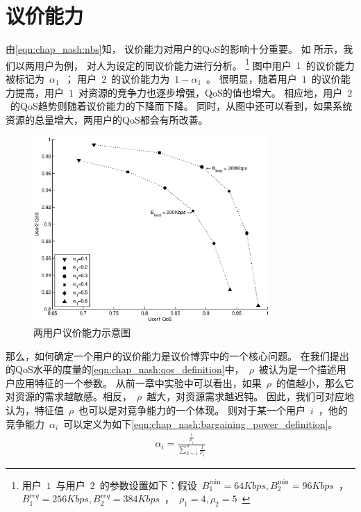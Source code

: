 \section{议价能力}
由\eqref{eqn:chap_nash:nbs}知，
议价能力对用户的QoS的影响十分重要。
如 所示，我们以两用户为例，
对人为设定的同议价能力进行分析。
\footnote{用户~$1$~与用户~$2$~的参数设置如下：假设~$B_1^{\min}=64Kbps, B_2^{\min}=96Kbps$~，~$B_1^{req}=256Kbps, B_2^{req}=384Kbps$~，~$\rho_1=4, \rho_2=5$~}
图中用户~$1$~的议价能力被标记为~$\alpha_1$~；
用户~$2$~的议价能力为~$1-\alpha_1$~。
很明显，随着用户~$1$~的议价能力提高，用户~$1$~对资源的竞争力也逐步增强，QoS的值也增大。
相应地，用户~$2$~的QoS趋势则随着议价能力的下降而下降。
同时，从图中还可以看到，如果系统资源的总量增大，两用户的QoS都会有所改善。
\begin{figure}[!tb] 
    \centering 
    \includegraphics[width = 9cm]{chap_nash_two_users_nbs_qos.eps} 
    \caption{两用户议价能力示意图}
    \label{fig:chap_nash:two_users_nbs_qos} 
\end{figure}
那么，如何确定一个用户的议价能力是议价博弈中的一个核心问题。
在我们提出的QoS水平的度量的\eqref{eqn:chap_nash:qos_definition}中，~$\rho$~被认为是一个描述用户应用特征的一个参数。
从前一章中实验中可以看出，如果~$\rho$~的值越小，那么它对资源的需求越敏感。相反，~$\rho$~越大，对资源需求越迟钝。
因此，我们可对应地认为，特征值~$\rho$~也可以是对竞争能力的一个体现。
则对于某一个用户~$i$~，他的竞争能力~$\alpha_i$~可以定义为如下\eqref{eqn:chap_nash:bargaining_power_definition}。
\begin{align}
    \alpha_i = \frac{\frac{1}{\rho_i}}{\sum_{k=1}^n \frac{1}{\rho_k} }
    \label{eqn:chap_nash:bargaining_power_definition}
\end{align}

